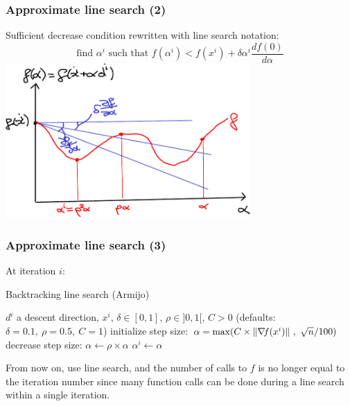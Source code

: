 \documentclass[12pt]{beamer}
\begin{document}
\begin{frame}
\frametitle{Approximate line search (2)} 
Sufficient decrease condition rewritten with line search notation:
\begin{equation*}
\text{find } \alpha^i \text{ such that } f(\alpha^i) < f(x^i) + \delta \alpha^i \frac{d f(0)}{d \alpha}
\end{equation*}
\centering
\includegraphics[width=0.7\textwidth]{line_search_backtrack-crop.pdf} 
\end{frame}

\begin{frame}
\frametitle{Approximate line search (3)} 
At iteration $i$:
\begin{block}{Backtracking line search (Armijo)}
\begin{algorithmic}
\REQUIRE $d^i$ a descent direction, $x^i$, $\delta \in [0,1]$, $\rho \in ]0,1[$, $C>0$
\STATE (defaults: $\delta=0.1,~\rho=0.5,~C=1$)
\STATE initialize step size: $\alpha = \max(C \times \lVert \nabla\!{f}(x^i) \rVert ~,~ \sqrt{n}/100) $ 
\STATE decrease step size: $\alpha \leftarrow \rho \times \alpha$
\ENDWHILE 
\RETURN $\alpha^i \leftarrow \alpha$
\end{algorithmic}
\end{block}
From now on, use line search, and the number of calls to $f$ is no longer equal to the iteration number since many function calls can be done during a line search within a single iteration.
\end{frame}
\end{document}
